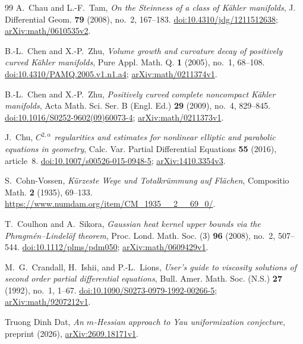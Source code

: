 \begin{thebibliography}{99}
A.~Chau and L.-F.~Tam,
\emph{On the Steinness of a class of K\"ahler manifolds},
J. Differential Geom. \textbf{79} (2008), no.~2, 167--183.
\href{https://doi.org/10.4310/jdg/1211512638}
{doi:10.4310/jdg/1211512638};
\href{https://arxiv.org/abs/math/0610535v2}{arXiv:math/0610535v2}.

B.-L.~Chen and X.-P.~Zhu,
\emph{Volume growth and curvature decay of positively curved
K\"ahler manifolds},
Pure Appl. Math. Q. \textbf{1} (2005), no.~1, 68--108.
\href{https://doi.org/10.4310/PAMQ.2005.v1.n1.a4}
{doi:10.4310/PAMQ.2005.v1.n1.a4};
\href{https://arxiv.org/abs/math/0211374v1}{arXiv:math/0211374v1}.

B.-L.~Chen and X.-P.~Zhu,
\emph{Positively curved complete noncompact K\"ahler manifolds},
Acta Math. Sci. Ser. B (Engl. Ed.) \textbf{29} (2009), no.~4, 829--845.
\href{https://doi.org/10.1016/S0252-9602(09)60073-4}
{doi:10.1016/S0252-9602(09)60073-4};
\href{https://arxiv.org/abs/math/0211373v1}{arXiv:math/0211373v1}.

J.~Chu,
\emph{$C^{2,\alpha}$ regularities and estimates for nonlinear elliptic
and parabolic equations in geometry},
Calc. Var. Partial Differential Equations \textbf{55} (2016), article~8.
\href{https://doi.org/10.1007/s00526-015-0948-5}
{doi:10.1007/s00526-015-0948-5};
\href{https://arxiv.org/abs/1410.3354v3}{arXiv:1410.3354v3}.

S.~Cohn-Vossen,
\emph{K\"urzeste Wege und Totalkr\"ummung auf Fl\"achen},
Compositio Math. \textbf{2} (1935), 69--133.
\url{https://www.numdam.org/item/CM_1935__2__69_0/}.

T.~Coulhon and A.~Sikora,
\emph{Gaussian heat kernel upper bounds via the
Phragm\'en--Lindel\"of theorem},
Proc. Lond. Math. Soc. (3) \textbf{96} (2008), no.~2, 507--544.
\href{https://doi.org/10.1112/plms/pdm050}{doi:10.1112/plms/pdm050};
\href{https://arxiv.org/abs/math/0609429v1}{arXiv:math/0609429v1}.

M.~G.~Crandall, H.~Ishii, and P.-L.~Lions,
\emph{User's guide to viscosity solutions of second order partial
differential equations},
Bull. Amer. Math. Soc. (N.S.) \textbf{27} (1992), no.~1, 1--67.
\href{https://doi.org/10.1090/S0273-0979-1992-00266-5}
{doi:10.1090/S0273-0979-1992-00266-5};
\href{https://arxiv.org/abs/math/9207212v1}{arXiv:math/9207212v1}.

Truong Dinh Dat,
\emph{An $m$-Hessian approach to Yau uniformization conjecture},
preprint (2026),
\href{https://arxiv.org/abs/2609.18171v1}{arXiv:2609.18171v1}.


\end{thebibliography}
